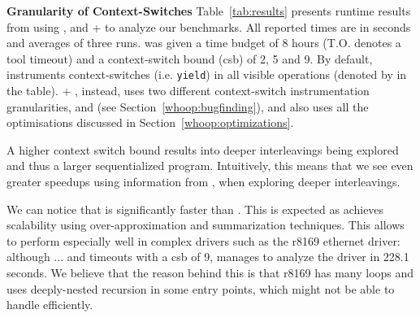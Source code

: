 \noindent
\textbf{Granularity of Context-Switches}\xspace\xspace Table~\ref{tab:results} presents runtime results from using \whoop, \corral and \whoop + \corral to analyze our benchmarks. All reported times are in seconds and averages of three runs. \corral was given a time budget of 8 hours (T.O. denotes a tool timeout) and a context-switch bound (csb) of 2, 5 and 9. By default, \corral instruments context-switches (i.e. \texttt{yield}) in all visible operations (denoted by \yieldall in the table). \whoop + \corral, instead, uses two different context-switch instrumentation granularities, \yieldcoarse and \yieldmr (see Section~\ref{whoop:bugfinding}), and also uses all the optimisations discussed in Section~\ref{whoop:optimizations}.

A higher context switch bound results into deeper interleavings being explored and thus a larger sequentialized program. Intuitively, this means that we see even greater speedups using information from \whoop, when exploring deeper interleavings.

We can notice that \whoop is significantly faster than \corral. This is expected as \whoop achieves scalability using over-approximation and summarization techniques. This allows \whoop to perform especially well in complex drivers such as the r8169 ethernet driver: although \corral ... and timeouts with a csb of 9, \whoop manages to analyze the driver in 228.1 seconds. We believe that the reason behind this is that r8169 has many loops and uses deeply-nested recursion in some entry points, which \corral might not be able to handle efficiently.


